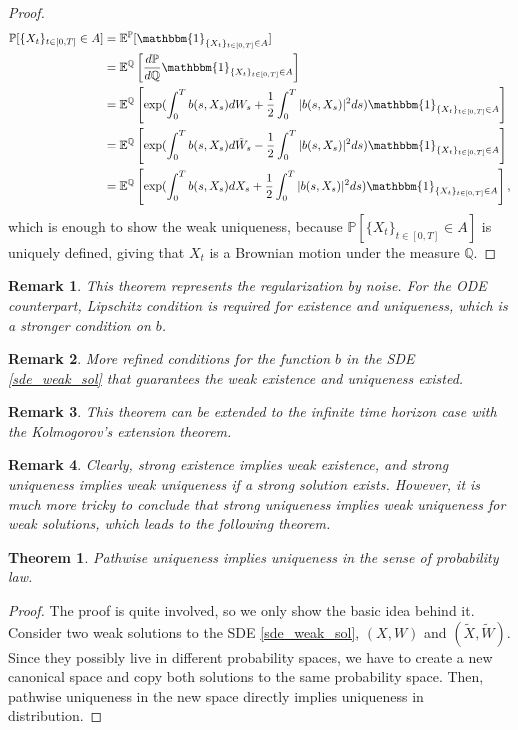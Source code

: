 \documentclass{article}
\newtheorem{theorem}{Theorem}
\newtheorem{rk}{Remark}
\begin{document}
\begin{proof}
\begin{equation*}
\begin{aligned}
\mathbb{P}[\{X_t\}_{t\in[0,T]}\in A]&=\mathbb{E}^\mathbb{P}[\mathbbm{1}_{\{X_t\}_{t\in[0,T]}\in A}]\\
&=\mathbb{E}^\mathbb{Q}\left[\frac{d\mathbb{P}}{d\mathbb{Q}}\mathbbm{1}_{\{X_t\}_{t\in[0,T]}\in A}\right]\\
&=\mathbb{E}^\mathbb{Q}\left[\exp(\int^T_0b(s,X_s)dW_s+\frac{1}{2}\int^T_0|b(s,X_s)|^2ds)\mathbbm{1}_{\{X_t\}_{t\in[0,T]}\in A}\right]\\
&=\mathbb{E}^\mathbb{Q}\left[\exp(\int^T_0b(s,X_s)d\tilde{W}_s-\frac{1}{2}\int^T_0|b(s,X_s)|^2ds)\mathbbm{1}_{\{X_t\}_{t\in[0,T]}\in A}\right]\\
&=\mathbb{E}^\mathbb{Q}\left[\exp(\int^T_0b(s,X_s)dX_s+\frac{1}{2}\int^T_0|b(s,X_s)|^2ds)\mathbbm{1}_{\{X_t\}_{t\in[0,T]}\in A}\right],
\end{aligned}
\end{equation*}
which is enough to show the weak uniqueness, because $\mathbb{P}[\{X_t\}_{t\in[0,T]}\in A]$ is uniquely defined, giving that $X_t$ is a Brownian motion under the measure $\mathbb{Q}$. 
\end{proof}

\begin{rk}
This theorem represents the regularization by noise. For the ODE counterpart, Lipschitz condition is required for existence and uniqueness, which is a stronger condition on $b$.
\end{rk}

\begin{rk}
More refined conditions for the function $b$ in the SDE \eqref{sde_weak_sol} that guarantees the weak existence and uniqueness existed. 
\end{rk}

\begin{rk}
This theorem can be extended to the infinite time horizon case with the Kolmogorov's extension theorem.
\end{rk}

\begin{rk}
Clearly, strong existence implies weak existence, and strong uniqueness implies weak uniqueness if a strong solution exists. However, it is much more tricky to conclude that strong uniqueness implies weak uniqueness for weak solutions, which leads to the following theorem.
\end{rk}

\begin{theorem}
Pathwise uniqueness implies uniqueness in the sense of probability law.
\end{theorem}

\begin{proof}
The proof is quite involved, so we only show the basic idea behind it. Consider two weak solutions to the SDE \eqref{sde_weak_sol}, $(X,W)$ and $(\tilde{X},\tilde{W})$. Since they possibly live in different probability spaces, we have to create a new canonical space and copy both solutions to the same probability space. Then, pathwise uniqueness in the new space directly implies uniqueness in distribution. 
\end{proof}
\end{document}
